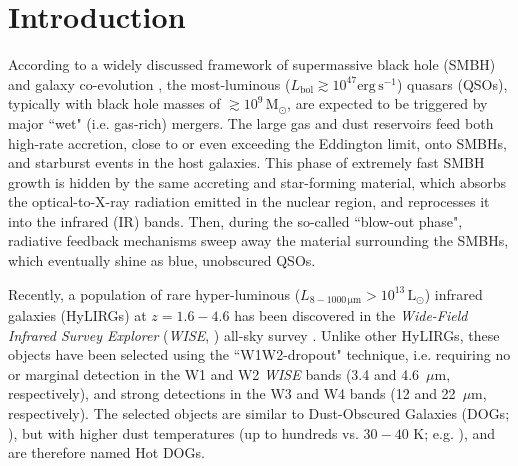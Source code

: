 \documentclass[useAMS,usenatbib]{mnras}
\newcommand*{\lbol}{\ensuremath{L_{\mathrm{bol}}}}
\newcommand*{\lunit}{\ensuremath{\mathrm{erg\,s^{-1}}}}
\begin{document}
\section{Introduction}\label{intro}
According to a widely discussed framework of supermassive black hole (SMBH) and galaxy co-evolution \mbox{\citep[e.g.,][]{Hopkins08, Alexander12}}, the most-luminous \mbox{($\lbol\gtrsim10^{47}\lunit$)} quasars (QSOs), typically with black hole masses of \mbox{$\gtrsim10^9\,\mathrm{M_\odot}$}, are expected to be triggered by major ``wet" (i.e. gas-rich) mergers. The large gas and dust reservoirs feed both high-rate accretion, close to or even exceeding the Eddington limit, onto SMBHs, and starburst events in the host galaxies. This phase of extremely fast SMBH growth is hidden by the same accreting and star-forming material, which absorbs the optical-to-X-ray radiation emitted in the nuclear region, and reprocesses it into the infrared (IR) bands. Then, during the so-called ``blow-out phase", radiative feedback mechanisms sweep away the material surrounding the SMBHs, which eventually shine as blue, unobscured QSOs.

Recently, a population of rare hyper-luminous (\mbox{$L_{\mathrm{8-1000\,\mu \mathrm{m}}}>10^{13}\,\mathrm{L_\odot}$}) infrared galaxies (HyLIRGs) at $z=1.6-4.6$ has been discovered in the \textit{Wide-Field Infrared Survey Explorer} (\textit{WISE}, \citealt{Wright10}) all-sky survey \citep{Eisenhardt12, Wu12,Tsai15, Assef16}. Unlike other HyLIRGs, these objects have been selected using the ``W1W2-dropout" technique, i.e. requiring no or marginal detection in the W1 and W2 \textit{WISE} bands (3.4 and 4.6~$\mu \mathrm{m}$, respectively), and strong detections in the W3 and W4 bands (12 and 22~$\mu \mathrm{m}$, respectively). The selected objects are similar to Dust-Obscured Galaxies (DOGs; \citealt{Dey08}), but with higher dust temperatures (up to hundreds vs. $30-40$ K; e.g. \citealt{Pope08, Melbourne12, Wu12,Jones14,Tsai15}), and are therefore named Hot DOGs. 
\end{document}
